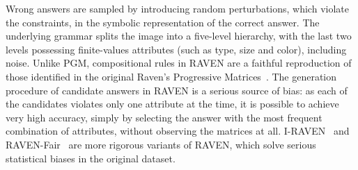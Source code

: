 Wrong answers are sampled by introducing random perturbations, which violate the constraints, in the symbolic representation of the correct answer.
The underlying grammar splits the image into a five-level hierarchy, with the last two levels possessing finite-values attributes (such as type, size and color), including noise.
Unlike PGM, compositional rules in RAVEN are a faithful reproduction of those identified in the original Raven's Progressive Matrices~\cite{carpenter1990one}.
The generation procedure of candidate answers in RAVEN is a serious source of bias: as each of the candidates violates only one attribute at the time, it is possible to achieve very high accuracy, simply by selecting the answer with the most frequent combination of attributes, without observing the matrices at all. 
I-RAVEN~\cite{hu2021stratified} and RAVEN-Fair~\cite{benny2021scale} are more rigorous variants of RAVEN, which solve serious statistical biases in the original dataset.

